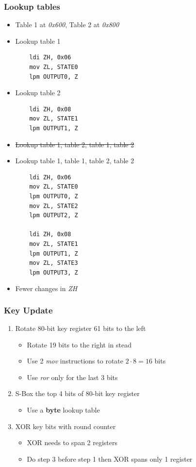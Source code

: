 \documentclass{beamer}
\begin{document}
\begin{frame}[fragile]
\frametitle{Lookup tables}
\begin{minipage}[t]{0.48\textwidth}

\begin{itemize}
\item Table 1 at \textit{0x600}, Table 2 at \textit{0x800}
\item Lookup table 1
\begin{lstlisting}
    ldi ZH, 0x06
    mov ZL, STATE0
    lpm OUTPUT0, Z
\end{lstlisting}
\item Lookup table 2
\begin{lstlisting}
    ldi ZH, 0x08
    mov ZL, STATE1
    lpm OUTPUT1, Z
\end{lstlisting}
\end{itemize}
\end{minipage}
\hfill
\begin{minipage}[t]{0.48\textwidth}
\begin{itemize}
\item \st{Lookup table 1, table 2, table 1, table 2}
\item Lookup table 1, table 1, table 2, table 2
\begin{lstlisting}
    ldi ZH, 0x06
    mov ZL, STATE0
    lpm OUTPUT0, Z
    mov ZL, STATE2
    lpm OUTPUT2, Z

    ldi ZH, 0x08
    mov ZL, STATE1
    lpm OUTPUT1, Z
    mov ZL, STATE3
    lpm OUTPUT3, Z
\end{lstlisting}
\item Fewer changes in \textit{ZH}
\end{itemize}
\end{minipage}
\end{frame}

\begin{frame}
\frametitle{Key Update}
\begin{enumerate}
\item Rotate 80-bit key register 61 bits to the left
  \begin{itemize}
  \item Rotate 19 bits to the right in stead
  \item Use 2 \textit{mov} instructions to rotate $2\cdot8=16$ bits
  \item Use \textit{ror} only for the last 3 bits
  \end{itemize}
\item S-Box the top 4 bits of 80-bit key register
  \begin{itemize}
  \item Use a \textbf{byte} lookup table
  \end{itemize}
\item XOR key bits with round counter
  \begin{itemize}
  \item XOR needs to span 2 registers
  \item Do step 3 before step 1 then XOR spans only 1 register
  \end{itemize}
\end{enumerate}
\end{frame}
\end{document}
